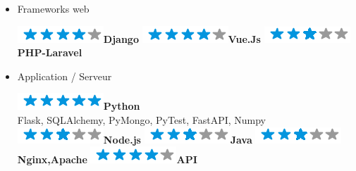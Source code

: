 \documentclass[]{friggeri-cv}
\begin{document}
\begin{flushleft}
\begin{multicols}{3}
\begin{itemize}
\item \large Frameworks web \
\normalsize
\begin{flushleft}

\includegraphics[scale=0.40]{res/img/4stars.png}\hspace{1.5mm}\textbf{Django}
\includegraphics[scale=0.40]{res/img/4stars.png}\hspace{1.5mm}\textbf{Vue.Js}
\includegraphics[scale=0.40]{res/img/3stars.png}\hspace{1.5mm}\textbf{PHP-Laravel}
\end{flushleft}            

\columnbreak
\item \large Application / Serveur \
\normalsize
\begin{flushleft}

\includegraphics[scale=0.40]{res/img/5stars.png}\hspace{1.5mm}\textbf{Python}\\Flask, SQLAlchemy, PyMongo, PyTest, FastAPI, Numpy\\\vspace{2mm}
\includegraphics[scale=0.40]{res/img/3stars.png}\hspace{1.5mm}\textbf{Node.js}
\includegraphics[scale=0.40]{res/img/3stars.png}\hspace{1.5mm}\textbf{Java}
\includegraphics[scale=0.40]{res/img/3stars.png}\hspace{1.5mm}\textbf{\small Nginx,Apache}
\includegraphics[scale=0.40]{res/img/4stars.png}\hspace{1.5mm}\textbf{API}
\end{flushleft}            


\end{itemize}
\end{multicols}
\end{flushleft}
\end{document}
